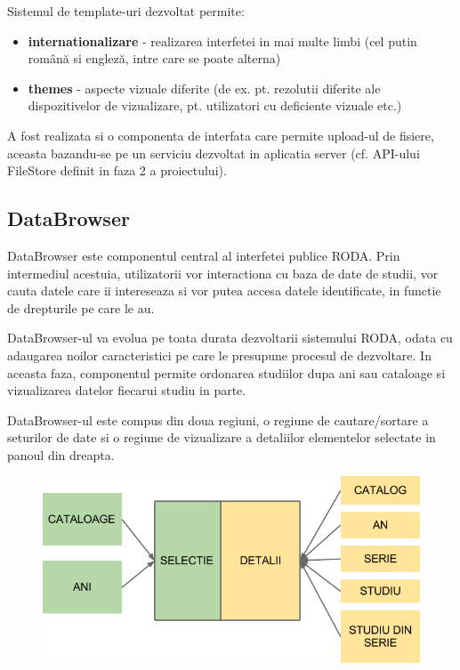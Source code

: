 \documentclass[a4paper, 10pt]{article}
\begin{document}
{\medskip

Sistemul de template-uri dezvoltat permite:
\begin{itemize}
\item {\textbf{internationalizare}} - realizarea interfetei in mai multe limbi (cel putin rom\^{a}n\u{a} si englez\u{a}, intre care se poate alterna)
\item {\textbf{themes}} - aspecte vizuale diferite (de ex. pt. rezolutii diferite ale dispozitivelor de vizualizare, pt. utilizatori cu deficiente vizuale etc.)
\end{itemize}

A fost realizata si o componenta de interfata care permite upload-ul de fisiere, aceasta bazandu-se pe un serviciu dezvoltat in aplicatia server (cf. API-ului FileStore definit in faza 2 a proiectului).

\medskip

\subsection*{DataBrowser}

\medskip

DataBrowser este componentul central al interfetei publice RODA. Prin intermediul acestuia, utilizatorii vor
interactiona cu baza de date de studii, vor cauta datele care ii intereseaza si vor putea accesa datele identificate,
in functie de drepturile pe care le au.

\medskip

DataBrowser-ul va evolua pe toata durata dezvoltarii sistemului RODA, odata cu adaugarea noilor caracteristici pe care
le presupune procesul de dezvoltare. In aceasta faza, componentul permite ordonarea studiilor dupa ani sau cataloage si
vizualizarea datelor fiecarui studiu in parte.

\medskip

DataBrowser-ul este compus din doua regiuni, o regiune de cautare/sortare a seturilor de date si o regiune de
vizualizare a detaliilor elementelor selectate in panoul din dreapta.

\medskip

\begin{figure}[h!tb]
\centering
\includegraphics[width=\textwidth]{roda_databrowser-img001.png} 
\end{figure}

}
\end{document}
